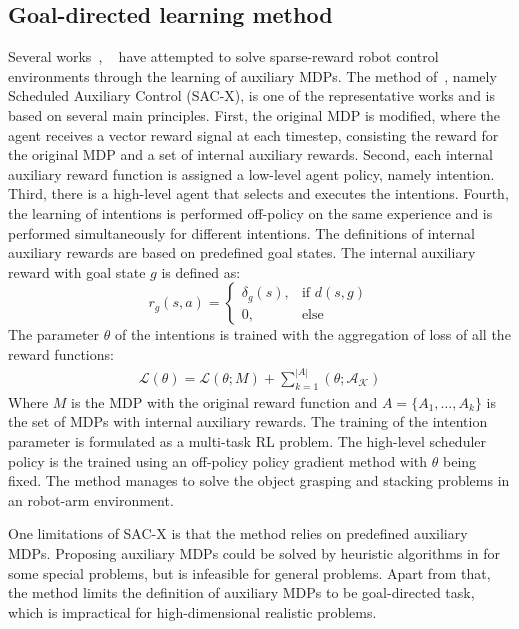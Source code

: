 \subsection{Goal-directed learning method}
Several works~\cite{riedmiller2018learning}, ~\cite{andrychowicz2017hindsight} have attempted to solve sparse-reward robot control environments through the learning of auxiliary MDPs.
The method of~\cite{riedmiller2018learning}, namely Scheduled Auxiliary Control (SAC-X), is one of the representative works and is based on several main principles. First, the original MDP is modified, where the agent receives a vector reward signal at each timestep, consisting the reward for the original MDP and a set of internal auxiliary rewards. Second, each internal auxiliary reward function is assigned a low-level agent policy, namely intention. Third, there is a high-level agent that selects and executes the intentions. Fourth, the learning of intentions is performed off-policy on the same experience and is performed simultaneously for different intentions.
The definitions of internal auxiliary rewards are based on predefined goal states. The internal auxiliary reward with goal state $g$ is defined as:
\begin{equation}
r_g(s,a)=
\begin{cases}
\delta_g(s),& \text{if } d(s,g)\\
0,              & \text{else}
\end{cases}
\end{equation}
The parameter $\theta$ of the intentions is trained with the aggregation of loss of all the reward functions:
\begin{align}
\mathcal{L}(\theta)  = \mathcal{L}(\theta;M) +\sum_{k=1}^{|A|} (\mathcal{\theta;A_K})
\end{align}
Where $M$ is the MDP with the original reward function and $A=\{A_1,\dots,A_k\}$ is the set of MDPs with internal auxiliary rewards. The training of the intention parameter is formulated as a multi-task RL problem.
The high-level scheduler policy is the trained using an off-policy policy gradient method with $\theta$ being fixed.
The method manages to solve the object grasping and stacking problems in an robot-arm environment. 

One limitations of SAC-X is that the method relies on predefined auxiliary MDPs. Proposing auxiliary MDPs could be solved by heuristic algorithms in for some special problems, but is infeasible for general problems. Apart from that, the method limits the definition of auxiliary MDPs to be goal-directed task, which is impractical for high-dimensional realistic problems.



